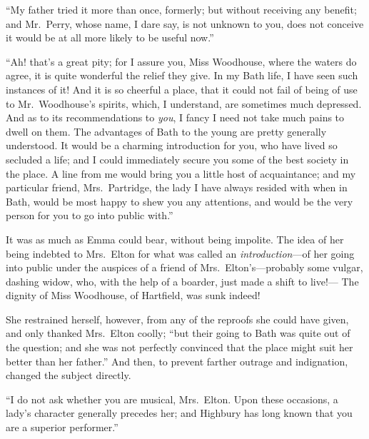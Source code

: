 ``My father tried it more than once, formerly; but without receiving
any benefit; and Mr.\ Perry, whose name, I dare say, is not unknown
to you, does not conceive it would be at all more likely to be
useful now.''

``Ah! that's a great pity; for I assure you, Miss Woodhouse,
where the waters do agree, it is quite wonderful the relief
they give.  In my Bath life, I have seen such instances of it!
And it is so cheerful a place, that it could not fail of being of
use to Mr.\ Woodhouse's spirits, which, I understand, are sometimes
much depressed.  And as to its recommendations to \emph{you}, I fancy I
need not take much pains to dwell on them.  The advantages of Bath
to the young are pretty generally understood.  It would be a charming
introduction for you, who have lived so secluded a life; and I could
immediately secure you some of the best society in the place.
A line from me would bring you a little host of acquaintance; and my
particular friend, Mrs.\ Partridge, the lady I have always resided
with when in Bath, would be most happy to shew you any attentions,
and would be the very person for you to go into public with.''

It was as much as Emma could bear, without being impolite.
The idea of her being indebted to Mrs.\ Elton for what was called
an \emph{introduction}---of her going into public under the auspices
of a friend of Mrs.\ Elton's---probably some vulgar, dashing widow,
who, with the help of a boarder, just made a shift to live!---%
The dignity of Miss Woodhouse, of Hartfield, was sunk indeed!

She restrained herself, however, from any of the reproofs she could
have given, and only thanked Mrs.\ Elton coolly; ``but their going
to Bath was quite out of the question; and she was not perfectly
convinced that the place might suit her better than her father.''
And then, to prevent farther outrage and indignation, changed the
subject directly.

``I do not ask whether you are musical, Mrs.\ Elton.  Upon these occasions,
a lady's character generally precedes her; and Highbury has long
known that you are a superior performer.''

